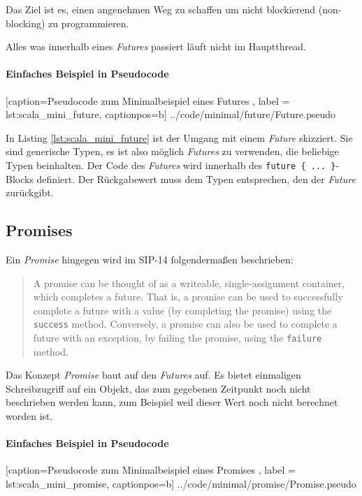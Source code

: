 Das Ziel ist es, einen angenehmen Weg zu schaffen um nicht
blockierend (\glqq non-blocking\grqq{}) zu programmieren.

Alles was innerhalb eines \emph{Futures} passiert läuft nicht im
Hauptthread.

\paragraph{Einfaches Beispiel in Pseudocode}


    [caption={Pseudocode zum Minimalbeispiel eines Futures },
       label = lst:scala_mini_future,
       captionpos=b]
 {../code/minimal/future/Future.pseudo}
 
In Listing \ref{lst:scala_mini_future} ist der Umgang mit einem \emph{Future}
skizziert. Sie sind generische Typen, es ist also möglich \emph{Futures}
zu verwenden, die beliebige Typen beinhalten. Der Code des \emph{Futures}
wird innerhalb des \texttt{future \{ ... \}}-Blocks definiert. Der
Rückgabewert muss dem Typen entsprechen, den der \emph{Future} zurückgibt.

\subsection{Promises}

Ein \emph{Promise} hingegen wird im SIP-14 folgendermaßen beschrieben:
\begin{quote}
A promise can be thought of as a writeable, single-assignment container, which 
completes a future. That is, a promise can be used to successfully complete a 
future with a value (by \glqq completing\grqq{} the promise) using the \texttt{success} method. 
Conversely, a promise can also be used to complete a future with an exception, 
by failing the promise, using the \texttt{failure} method.
\end{quote}

Das Konzept \emph{Promise} baut auf den \emph{Futures} auf. Es bietet
einmaligen Schreibzugriff auf ein Objekt, das zum gegebenen Zeitpunkt
noch nicht beschrieben werden kann, zum Beispiel weil dieser Wert
noch nicht berechnet worden ist.

\paragraph{Einfaches Beispiel in Pseudocode}


    [caption={Pseudocode zum Minimalbeispiel eines Promises },
       label = lst:scala_mini_promise,
       captionpos=b]
 {../code/minimal/promise/Promise.pseudo}
 

